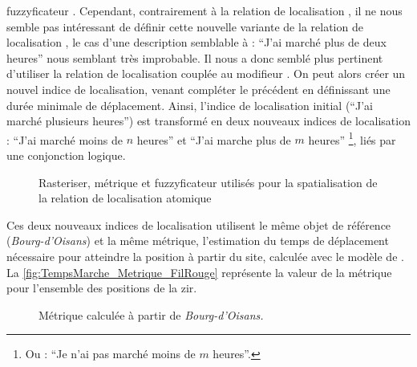 fuzzyficateur . Cependant, contrairement à la
relation de localisation , il ne
nous semble pas intéressant de définir cette nouvelle variante de la
relation de localisation , le cas
d'une description semblable à : \enquote{J'ai marché plus de deux
  heures} nous semblant très improbable. Il nous a donc semblé plus
pertinent d'utiliser la relation de localisation
 couplée au modifieur
. On peut alors créer un nouvel indice de
localisation, venant compléter le précédent en définissant une durée
minimale de déplacement. Ainsi, l'indice de localisation initial
(\enquote{J'ai marché plusieurs heures}) est transformé en deux
nouveaux indices de localisation : \enquote{J'ai marché moins de \(n\)
  heures} et \enquote{J'ai marche plus de \(m\) heures} \footnote{Ou :
  \enquote{Je n'ai pas marché moins de \(m\) heures}.}, liés par une
conjonction logique.

\begin{figure}
  \centering
  
  \caption{Rasteriser, métrique et fuzzyficateur utilisés pour la
    spatialisation de la relation de localisation atomique
    \protect{}}
  \label{fig:ex_parties_statialisation_ATempsDeMarcheDe}
\end{figure}

Ces deux nouveaux indices de localisation utilisent le même objet de
référence (\ie \emph{Bourg-d'Oisans}) et la même métrique,
l'estimation du temps de déplacement nécessaire pour atteindre la
position à partir du site, calculée avec le modèle de
\textcite{Tobler1993}. La \autoref{fig:TempsMarche_Metrique_FilRouge}
représente la valeur de la métrique pour l'ensemble des positions de
la \ac{zir}.

\begin{figure}[htb]
  \centering
  
  \caption{Métrique \protect{} calculée à
    partir de \emph{Bourg-d'Oisans.}}
  \label{fig:TempsMarche_Metrique_FilRouge}
\end{figure}

